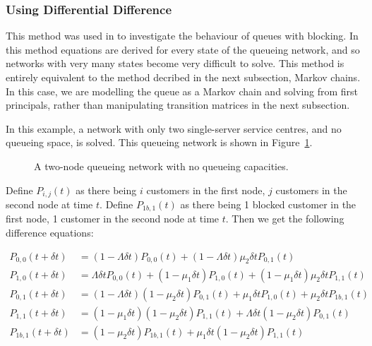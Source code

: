 \documentclass{article}
\begin{document}
\subsubsection{Using Differential Difference}
This method was used in \cite{baber08} to investigate the behaviour of queues with blocking.
In this method equations are derived for every state of the queueing network, and so networks with very many states become very difficult to solve.
This method is entirely equivalent to the method decribed in the next subsection, Markov chains.
In this case, we are modelling the queue as a Markov chain and solving from first principals, rather than manipulating transition matrices in the next subsection.

In this example, a network with only two single-server service centres, and no queueing space, is solved.
This queueing network is shown in Figure~\ref{fig:2nodesNoQs}.

\begin{figure}[H]
    
    \caption{A two-node queueing network with no queueing capacities.}
    \label{fig:2nodesNoQs}
\end{figure}

Define $P_{i,j}(t)$ as there being $i$ customers in the first node, $j$ customers in the second node at time $t$.
Define $P_{1b,1}(t)$ as there being 1 blocked customer in the first node, 1 customer in the second node at time $t$.
Then we get the following difference equations:

\begin{align*}
    P_{0,0}(t+\delta t) &= (1 - \Lambda \delta t)P_{0,0}(t) + (1 - \Lambda \delta t)\mu_2 \delta t P_{0,1}(t)\\
    P_{1,0}(t+\delta t) &= \Lambda \delta t P_{0,0}(t) + (1 - \mu_1 \delta t) P_{1,0}(t) + (1 - \mu_1 \delta t)\mu_2 \delta t P_{1,1}(t)\\
    P_{0,1}(t+\delta t) &= (1 - \Lambda \delta t)(1 - \mu_2 \delta t)P_{0,1}(t) + \mu_1 \delta t P_{1,0}(t) + \mu_2 \delta t P_{1b,1}(t)\\
    P_{1,1}(t+\delta t) &= (1 - \mu_1 \delta t)(1 - \mu_2 \delta t)P_{1,1}(t) + \Lambda \delta t (1 - \mu_2 \delta t) P_{0,1}(t)\\
    P_{1b,1}(t+\delta t) &= (1 - \mu_2 \delta t)P_{1b,1}(t) + \mu_1 \delta t (1 - \mu_2 \delta t)P_{1,1}(t)\\
\end{align*}
\end{document}
